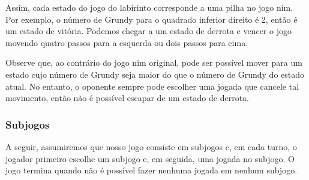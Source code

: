 \begin{center}
\end{center}

Assim, cada estado do jogo do labirinto corresponde a uma pilha no jogo nim. Por exemplo, o número de Grundy para o quadrado inferior direito é 2, então é um estado de vitória. Podemos chegar a um estado de derrota e vencer o jogo movendo quatro passos para a esquerda ou dois passos para cima.

Observe que, ao contrário do jogo nim original, pode ser possível mover para um estado cujo número de Grundy seja maior do que o número de Grundy do estado atual. No entanto, o oponente sempre pode escolher uma jogada que cancele tal movimento, então não é possível escapar de um estado de derrota.

\subsubsection{Subjogos}

A seguir, assumiremos que nosso jogo consiste em subjogos e, em cada turno, o jogador primeiro escolhe um subjogo e, em seguida, uma jogada no subjogo. O jogo termina quando não é possível fazer nenhuma jogada em nenhum subjogo.

